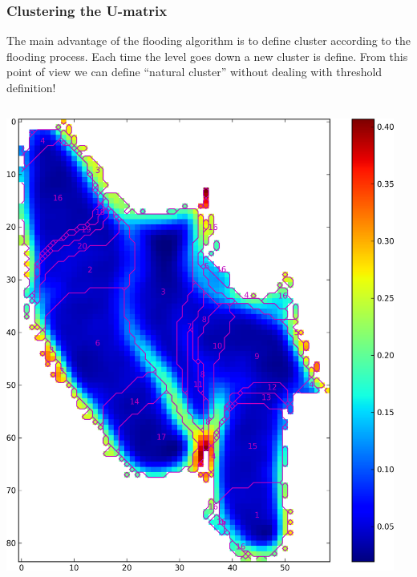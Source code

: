 \begin{frame}
    \frametitle{Clustering the U-matrix}
    The main advantage of the flooding algorithm is to define cluster according to the flooding process.
    Each time the level goes down a new cluster is define.
    From this point of view we can define ``natural cluster'' without dealing with threshold definition!
    \begin{columns}
        \begin{column}{.4\textwidth}
            \includegraphics[width=\textwidth]{figures/umat_clust.png}
        \end{column}
        \begin{column}{.6\textwidth}

\end{column}
\end{columns}
\end{frame}
